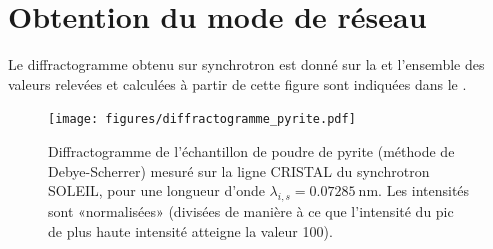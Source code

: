 \section{Obtention du mode de réseau}

Le diffractogramme obtenu sur synchrotron est donné sur la  et l'ensemble des valeurs relevées et calculées à partir de cette figure sont indiquées dans le .

\begin{figure}
\caption{Diffractogramme de l'échantillon de poudre de pyrite (méthode de Debye-Scherrer) mesuré sur la ligne CRISTAL du synchrotron SOLEIL, pour une longueur d'onde \(\lambda_{i,s} = \SI{0.07285}{\nano\metre}\). Les intensités sont «normalisées» (divisées de manière à ce que l'intensité du pic de plus haute intensité atteigne la valeur 100).}
\texttt{[image: figures/diffractogramme\_pyrite.pdf]}
\label{fig:soleilPowderDiffractogram}
\end{figure}

